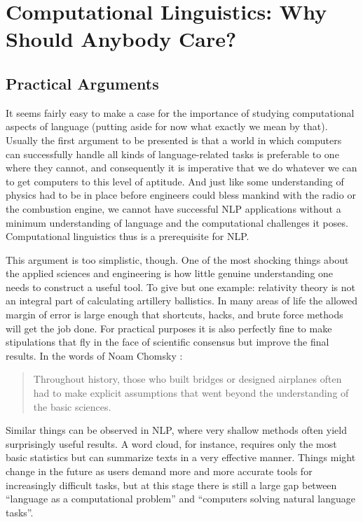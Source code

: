 \section{Computational Linguistics: Why Should Anybody Care?}

\subsection{Practical Arguments}

It seems fairly easy to make a case for the importance of studying computational aspects of language (putting aside for now what exactly we mean by that). 
Usually the first argument to be presented is that a world in which computers can successfully handle all kinds of language-related tasks is preferable to one where they cannot, and consequently it is imperative that we do whatever we can to get computers to this level of aptitude.
And just like some understanding of physics had to be in place before engineers could bless mankind with the radio or the combustion engine, we cannot have successful NLP applications without a minimum understanding of language and the computational challenges it poses.
Computational linguistics thus is a prerequisite for NLP\@.

This argument is too simplistic, though.
One of the most shocking things about the applied sciences and engineering is how little genuine understanding one needs to construct a useful tool.
To give but one example: relativity theory is not an integral part of calculating artillery ballistics.
In many areas of life the allowed margin of error is large enough that shortcuts, hacks, and brute force methods will get the job done.
For practical purposes it is also perfectly fine to make stipulations that fly in the face of scientific consensus but improve the final results.
In the words of Noam Chomsky \citep[147]{Chomsky90}:
%
\begin{quote}
    Throughout history, those who built bridges or designed airplanes often had to make explicit assumptions that went beyond the understanding of the basic sciences.
\end{quote}
%
Similar things can be observed in NLP, where very shallow methods often yield surprisingly useful results.
A word cloud, for instance, requires only the most basic statistics but can summarize texts in a very effective manner.
Things might change in the future as users demand more and more accurate tools for increasingly difficult tasks, but at this stage there is still a large gap between ``language as a computational problem'' and ``computers solving natural language tasks''.

